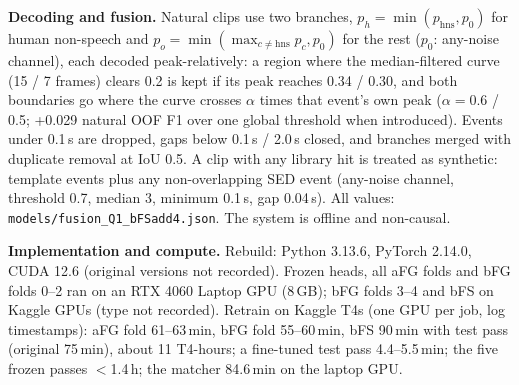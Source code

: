 \documentclass[conference]{IEEEtran}
\begin{document}
\textbf{Decoding and fusion.} Natural clips use two branches, $p_h=\min(p_{\text{hns}},p_0)$ for human non-speech
and $p_o=\min(\max_{c\ne\text{hns}}p_c,p_0)$ for the rest ($p_0$: any-noise channel), each decoded
peak-relatively: a region where the median-filtered curve (15 / 7 frames) clears 0.2 is kept if its peak reaches
0.34 / 0.30, and both boundaries go where the curve crosses $\alpha$ times that event's own peak ($\alpha=0.6$ /
0.5; +0.029 natural OOF F1 over one global threshold when introduced). Events under 0.1\,s are dropped, gaps below
0.1\,s / 2.0\,s closed, and branches merged with duplicate removal at IoU 0.5. A clip with any library hit is
treated as synthetic: template events plus any non-overlapping SED event (any-noise channel, threshold 0.7, median
3, minimum 0.1\,s, gap 0.04\,s). All values: \texttt{models/fusion\_Q1\_bFSadd4.json}. The system is offline and
non-causal.

\textbf{Implementation and compute.} Rebuild: Python 3.13.6, PyTorch 2.14.0, CUDA 12.6 (original versions not
recorded). Frozen heads, all aFG folds and bFG folds 0--2 ran on an RTX 4060 Laptop GPU (8\,GB); bFG folds 3--4 and
bFS on Kaggle GPUs (type not recorded). Retrain on Kaggle T4s (one GPU per job, log timestamps): aFG fold
61--63\,min, bFG fold 55--60\,min, bFS 90\,min with test pass (original 75\,min), about 11 T4-hours; a fine-tuned
test pass 4.4--5.5\,min; the five frozen passes $<$1.4\,h; the matcher 84.6\,min on the laptop GPU.
\end{document}
